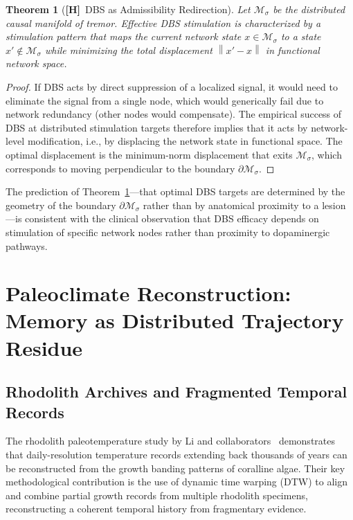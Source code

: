 \documentclass[11pt, oneside]{article}
\numberwithin{equation}{section}
\newcommand{\ClaimH}{\textcolor{rsvpgray}{\textbf{[H]}}}
\theoremstyle{rsvpstyle}
\newtheorem{theorem}{Theorem}[section]
\theoremstyle{remark}
\newcommand{\norm}[1]{\left\lVert #1 \right\rVert}
\begin{document}
\begin{theorem}[\ClaimH\ DBS as Admissibility Redirection]
\label{thm:dbs}
Let $\mathcal{M}_\sigma$ be the distributed causal manifold of tremor. Effective DBS
stimulation is characterized by a stimulation pattern that maps the current network
state $x \in \mathcal{M}_\sigma$ to a state $x' \notin \mathcal{M}_\sigma$ while
minimizing the total displacement $\norm{x' - x}$ in functional network space.
\end{theorem}

\begin{proof}
If DBS acts by direct suppression of a localized signal, it would need to eliminate
the signal from a single node, which would generically fail due to network redundancy
(other nodes would compensate). The empirical success of DBS at distributed stimulation
targets therefore implies that it acts by network-level modification, i.e., by displacing
the network state in functional space. The optimal displacement is the minimum-norm
displacement that exits $\mathcal{M}_\sigma$, which corresponds to moving perpendicular
to the boundary $\partial \mathcal{M}_\sigma$.
\end{proof}

The prediction of Theorem~\ref{thm:dbs}---that optimal DBS targets are determined by
the geometry of the boundary $\partial \mathcal{M}_\sigma$ rather than by anatomical
proximity to a lesion---is consistent with the clinical observation that DBS efficacy
depends on stimulation of specific network nodes rather than proximity to dopaminergic
pathways.

\section{Paleoclimate Reconstruction: Memory as Distributed Trajectory Residue}

\subsection{Rhodolith Archives and Fragmented Temporal Records}

The rhodolith paleotemperature study by Li and collaborators~\cite{Li2026Rhodoliths}
demonstrates that daily-resolution temperature records extending back thousands of years
can be reconstructed from the growth banding patterns of coralline algae. Their key
methodological contribution is the use of dynamic time warping (DTW) to align and
combine partial growth records from multiple rhodolith specimens, reconstructing a
coherent temporal history from fragmentary evidence.
\end{document}

